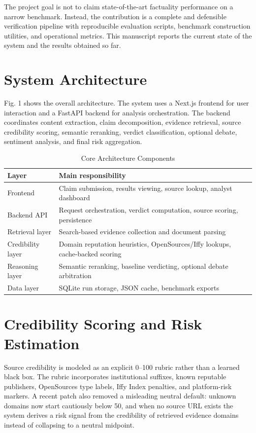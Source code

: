 \documentclass[conference]{IEEEtran}
\begin{document}
The project goal is not to claim state-of-the-art factuality performance on a narrow benchmark. Instead, the contribution is a complete and defensible verification pipeline with reproducible evaluation scripts, benchmark construction utilities, and operational metrics. This manuscript reports the current state of the system and the results obtained so far.

\section{System Architecture}
Fig. 1 shows the overall architecture. The system uses a Next.js frontend for user interaction and a FastAPI backend for analysis orchestration. The backend coordinates content extraction, claim decomposition, evidence retrieval, source credibility scoring, semantic reranking, verdict classification, optional debate, sentiment analysis, and final risk aggregation.

\begin{table}[t]
\centering
\caption{Core Architecture Components}
\label{tab:architecture}
\renewcommand{\arraystretch}{1.1}
\begin{tabular}{p{2.1cm} p{5.0cm}}
\toprule
\textbf{Layer} & \textbf{Main responsibility} \\
\midrule
Frontend & Claim submission, results viewing, source lookup, analyst dashboard \\
Backend API & Request orchestration, verdict computation, source scoring, persistence \\
Retrieval layer & Search-based evidence collection and document parsing \\
Credibility layer & Domain reputation heuristics, OpenSources/Iffy lookups, cache-backed scoring \\
Reasoning layer & Semantic reranking, baseline verdicting, optional debate arbitration \\
Data layer & SQLite run storage, JSON cache, benchmark exports \\
\bottomrule
\end{tabular}
\end{table}

\section{Credibility Scoring and Risk Estimation}
Source credibility is modeled as an explicit 0--100 rubric rather than a learned black box. The rubric incorporates institutional suffixes, known reputable publishers, OpenSources type labels, Iffy Index penalties, and platform-risk markers. A recent patch also removed a misleading neutral default: unknown domains now start cautiously below 50, and when no source URL exists the system derives a risk signal from the credibility of retrieved evidence domains instead of collapsing to a neutral midpoint.
\end{document}
